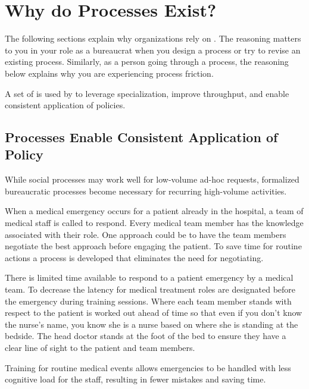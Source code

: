 \section{Why do Processes Exist?\label{sec:why-processes-exist}}


The following sections explain why organizations rely on \iftoggle{glossarysubstitutionworks}{\glspl{process}}{processes}. 
The reasoning matters to you in your role as a bureaucrat when you design a process 
\iftoggle{haspagenumbers}{ (page~\pageref{sec:design-of-processes})}{}
or try to revise an existing process. Similarly, as a person going through a process, the reasoning below explains why you are experiencing \gls{process friction}. 

A set of \iftoggle{glossarysubstitutionworks}{\glspl{process}}{processes}
\iftoggle{glossaryinmargin}{\marginpar{[Glossary]}}{} is used by \iftoggle{glossarysubstitutionworks}{\glspl{bureaucrat}}{bureaucrats} to leverage specialization, improve throughput, and enable consistent application of policies. 

\subsection*{Processes Enable Consistent Application of Policy}

While social processes may work well for low-volume ad-hoc requests, formalized bureaucratic processes become necessary for recurring high-volume activities.

\begin{mdframed}[frametitle={Emergency Medical Team},frametitlerule=true,frametitlealignment=\centering]
When a medical emergency occurs for a patient already in the hospital, a team of medical staff is called to respond. Every medical team member has the knowledge associated with their role. One approach could be to have the team members negotiate the best approach before engaging the patient. To save time for routine actions a process is developed that eliminates the need for negotiating. 

There is limited time available to respond to a patient emergency by a medical team. To decrease the latency for medical treatment roles are designated before the emergency during training sessions. Where each team member stands with respect to the patient is worked out ahead of time so that even if you don't know the nurse's name, you know she is a nurse based on where she is standing at the bedside. The head doctor stands at the foot of the bed to ensure they have a clear line of sight to the patient and team members.

Training for routine medical events allows emergencies to be handled with less cognitive load for the staff, resulting in fewer mistakes and saving time. 
\end{mdframed}

